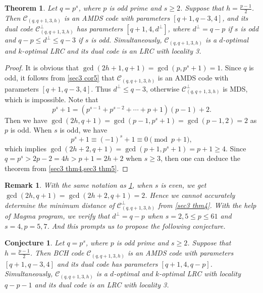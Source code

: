 \documentclass[10pt]{article}%
\newtheorem{theorem}{Theorem}%
\newtheorem{remark}{Remark}%
\newtheorem{conjecture}{Conjecture}%
\begin{document}
	\begin{theorem}
		\label{sec4 thm2}
		Let $q=p^s$, where $p$ is odd prime and $s \ge 2$. Suppose that $h=\frac{p-1}{2}$. Then $\mathcal{C}_{(q,q+1,3,h)}$ is an AMDS code with parameters $[q+1,q-3,4]$, and its dual code $\mathcal{C}_{(q,q+1,3,h)}^{\perp}$ has parameters $[q+1,4,d^\perp]$, where $d^\perp=q-p$ if $s$ is odd and $q-p\le d^\perp\le q-3$ if $s$ is odd. Simultaneously, $\mathcal{C}_{(q,q+1,3,h)}$ is a $d$-optimal and $k$-optimal LRC and its dual code is an LRC with locality 3.
	\end{theorem}
	\begin{proof}
		It is obvious that $\gcd(2h+1,q+1)=\gcd(p,p^s+1)=1$. Since $q$ is odd, it follows from \cref{sec3 cor5} that $\mathcal{C}_{(q,q+1,3,h)}$ is an AMDS code with parameters $[q+1,q-3,4]$. Thus $d^\perp \le q-3$, otherwise $\mathcal{C}_{(q,q+1,3,h)}^{\perp}$ is MDS, which is impossible. Note that
		\begin{equation*}
			p^s+1=\left(p^{s-1}+p^{s-2}+\cdots+p+1\right)(p-1)+2.
		\end{equation*}
		Then we have $\gcd(2h,q+1)=\gcd(p-1,p^s+1)=\gcd(p-1,2)=2$ as $p$ is odd. When $s$ is odd, we have 
		\begin{equation*}
			p^s+1\equiv(-1)^s+1\equiv0\pmod{p+1},
		\end{equation*}
		which implies $\gcd(2h+2,q+1)=\gcd(p+1,p^s+1)=p+1\ge4$. Since $q=p^s>2p-2=4h>p+1=2h+2$ when $s\ge 3$, then one can deduce the theorem from \cref{sec3 thm4,sec3 thm5}.
	\end{proof}
	
	\begin{remark}\label{sec4 rmk1}
		With the same notation as \cref{sec4 thm2}, when $s$ is even, we get $\gcd(2h,q+1)=\gcd(2h+2,q+1)=2$. Hence we cannot accurately determine the minimum distance of $\mathcal{C}_{(q,q+1,3,h)}^\perp$ from \cref{sec3 thm4}. With the help of Magma program, we verify that $d^\perp=q-p$ when $s=2,5\le p \le 61$ and $s=4,p=5,7$. And this prompts us to propose the following conjecture.
	\end{remark}
	
	\begin{conjecture}
		Let $q=p^s$, where $p$ is odd prime and $s \ge 2$. Suppose that $h=\frac{p-1}{2}$. Then BCH code $\mathcal{C}_{(q,q+1,3,h)}$ is an AMDS code with parameters $[q+1,q-3,4]$ and its dual code has parameters $[q+1,4,q-p]$. Simultaneously, $\mathcal{C}_{(q,q+1,3,h)}$ is a $d$-optimal and $k$-optimal LRC with locality $q-p-1$ and its dual code is an LRC with locality 3.
	\end{conjecture}
	
\end{document}
